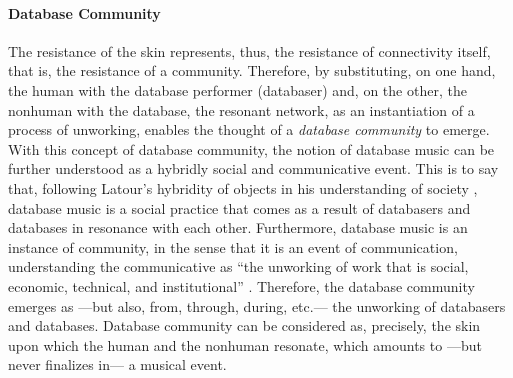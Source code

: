\paragraph{Database Community}
The resistance of the skin represents, thus, the resistance of connectivity itself, that is, the resistance of a community. Therefore, by substituting, on one hand, the human with the database performer (databaser) and, on the other, the nonhuman with the database, the resonant network, as an instantiation of a process of unworking, enables the thought of a \textit{database community} to emerge. With this concept of database community, the notion of database music can be further understood as a hybridly social and communicative event. This is to say that, following Latour's hybridity of objects in his understanding of society \parencite[2]{Lat90:On}, database music is a social practice that comes as a result of databasers and databases in resonance with each other. Furthermore, database music is an instance of community, in the sense that it is an event of communication, understanding the communicative as ``the unworking of work that is social, economic, technical, and institutional'' \parencite[31]{Nan91:The}. Therefore, the database community emerges as ---but also, from, through, during, etc.--- the unworking of databasers and databases. Database community can be considered as, precisely, the skin upon which the human and the nonhuman resonate, which amounts to ---but never finalizes in--- a musical event.
